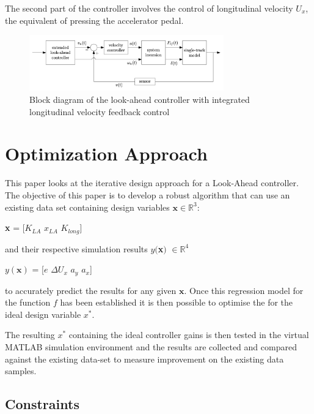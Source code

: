 \documentclass[conf]{new-aiaa}
\begin{document}
The second part of the controller involves the control of longitudinal velocity $U_x$, the equivalent of pressing the accelerator pedal.

\begin{figure}[hbt!]
\centering
\includegraphics[width=0.75\textwidth]{lookahead_fb}
\caption{Block diagram of the look-ahead controller with integrated longitudinal velocity feedback control\cite{bayuwindra2019look}}
\end{figure}

\section{Optimization Approach}
This paper looks at the iterative design approach for a Look-Ahead controller. The objective of this paper is to develop a robust algorithm that can use an existing data set containing design variables $\textbf{x} \in \mathbb{R}^3$:
\begin{center}
\textbf{x} = [$K_{LA}$    $x_{LA}$  $K_{long}$]
 \end{center}
and their respective simulation results $y($\textbf{x}$)$ $\in \mathbb{R}^4$
 \begin{center}
$y(\textbf{x})$ = [$e$    $\Delta U_{x}$  $a_y$   $a_x$]
 \end{center}
to accurately predict the results for any given $\textbf{x}$. Once this regression model for the function $f$ has been established it is then possible to optimise the for the ideal design variable $x^*$. 
 
The resulting $x^*$ containing the ideal controller gains is then tested in the virtual MATLAB simulation environment and the results are collected and compared against the existing data-set to measure improvement on the existing data samples.

\subsection{Constraints}
\end{document}
